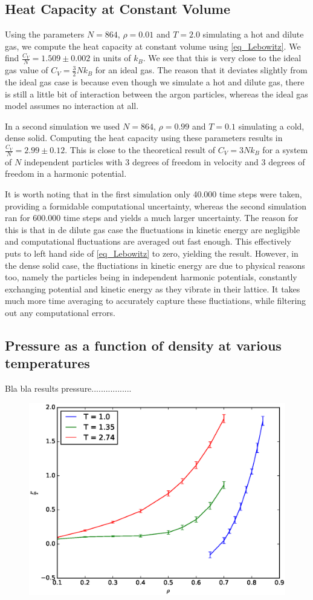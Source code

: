 \documentclass[twoside]{article}
\begin{document}
\subsection{Heat Capacity at Constant Volume}
Using the parameters $N=864$, $\rho=0.01$ and $T=2.0$ simulating a hot and dilute gas, we compute the heat capacity at constant volume using \eqref{eq_Lebowitz}. We find $\frac{C_V}{N} = 1.509  \pm 0.002 $ in units of $k_B$. We see that this is very close to the ideal gas value of $C_V = \frac{3}{2} N k_B$ for an ideal gas. The reason that it deviates slightly from the ideal gas case is because even though we simulate a hot and dilute gas, there is still a little bit of interaction between the argon particles, whereas the ideal gas model assumes no interaction at all.

In a second simulation we used $N=864$, $\rho=0.99$ and $T=0.1$ simulating a cold, dense solid. Computing the heat capacity using these parameters results in $\frac{C_V}{N} = 2.99  \pm  0.12 $. This is close to the theoretical result of $C_V = 3 N k_B$ for a system of $N$ independent particles with 3 degrees of freedom in velocity and 3 degrees of freedom in a harmonic potential.

It is worth noting that in the first simulation only 40.000 time steps were taken, providing a formidable computational uncertainty, whereas the second simulation ran for 600.000 time steps and yields a much larger uncertainty. The reason for this is that in de dilute gas case the fluctuations in kinetic energy are negligible and computational fluctuations are averaged out fast enough. This effectively puts to left hand side of \eqref{eq_Lebowitz} to zero, yielding the result. However, in the dense solid case, the fluctiations in kinetic energy are due to physical reasons too, namely the particles being in independent harmonic potentials, constantly exchanging potential and kinetic energy as they vibrate in their lattice. It takes much more time averaging to accurately capture these fluctiations, while filtering out any computational errors. 

\subsection{Pressure as a function of density at various temperatures}
Bla bla results pressure.................

\begin{figure}
\centering
\includegraphics[width=0.7\linewidth]{fig/figure_pressure}
\caption{}
\label{fig:figure_pressure}
\end{figure}
\end{document}
